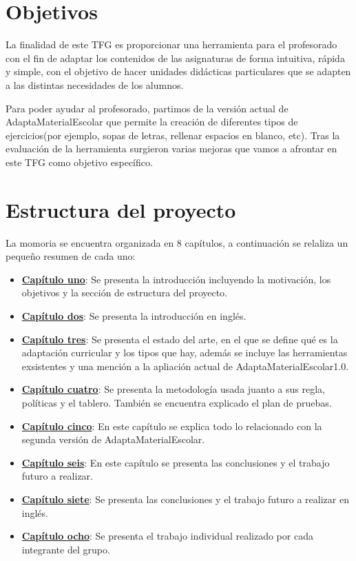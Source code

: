 \section{Objetivos}\label{cap:objetivos}
La finalidad de este TFG es proporcionar una herramienta para el profesorado con el fin de adaptar los contenidos de las asignaturas de forma intuitiva, rápida y simple, con el objetivo de hacer unidades didácticas particulares que se adapten a las distintas necesidades de los alumnos.

Para poder ayudar al profesorado, partimos de la versión actual de AdaptaMaterialEscolar que permite la creación de diferentes tipos de ejercicios(por ejemplo, sopas de letras, rellenar espacios en blanco, etc). Tras la evaluación de la herramienta surgieron varias mejoras que vamos a afrontar en este TFG como objetivo específico. 


\section{Estructura del proyecto}\label{cap:estructura}
La momoria se encuentra organizada en 8 capítulos, a continuación se relaliza un pequeño resumen de cada uno:
\begin{itemize}
    \item \textbf{\hyperref[ch:introduccion]{Capítulo uno}}: Se presenta la introducción incluyendo la motivación, los objetivos y la sección de estructura del proyecto.
    \item \textbf{\hyperref[cap:introduction]{Capítulo dos}}: Se presenta la introducción en inglés. 
    \item \textbf{\hyperref[cap:estadoDelArte]{Capítulo tres}}: Se presenta el estado del arte, en el que se define qué es la adaptación curricular y los tipos que hay, además se incluye las herramientas exsistentes y una mención a la apliación actual de  AdaptaMaterialEscolar1.0.
    \item \textbf{\hyperref[cap:metodologia]{Capítulo cuatro}}: Se presenta la metodología usada juanto a sus regla, políticas y el tablero. También se encuentra explicado el plan de pruebas.
    \item \textbf{\hyperref[cap:AdaptaMaterialEscolar2.0]{Capítulo cinco}}: En este capítulo se explica todo lo relacionado con la segunda versión de AdaptaMaterialEscolar.
    \item \textbf{\hyperref[cap:conclusiones]{Capítulo seis}}: En este capítulo se presenta las conclusiones y el trabajo futuro a realizar.
    \item \textbf{\hyperref[cap:conclusions]{Capítulo siete}}: Se presenta las conclusiones y el trabajo futuro a realizar en inglés.
    \item \textbf{\hyperref[cap:trabajo_individual]{Capítulo ocho}}: Se presenta el trabajo individual realizado por cada integrante del grupo.
\end{itemize}